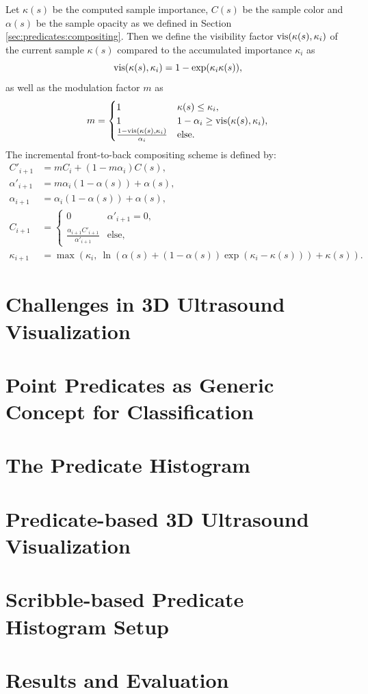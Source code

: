 Let $\kappa(s)$ be the computed sample importance, $C(s)$ be the sample color and $\alpha(s)$ be the sample opacity as we defined in Section \ref{sec:predicates:compositing}. 
Then we define the visibility factor $\text{vis}(\kappa(s), \kappa_i)$ of the current sample $\kappa(s)$ compared to the accumulated importance $\kappa_i$ as
\begin{equation}
	\text{vis}(\kappa(s), \kappa_i)		=		1 - \exp (\kappa_i \kappa(s)),
\end{equation}
as well as the modulation factor $m$ as
\begin{equation}
	m  = 
	\begin{cases}
		1							&		\kappa(s) \leq \kappa_i, \\
		1							&		1-\alpha_i \geq \text{vis}(\kappa(s), \kappa_i), \\
		\frac{1-\text{vis}(\kappa(s), \kappa_i)}{\alpha_i}		& 	\text{else}.
	\end{cases}
\end{equation}
The incremental front-to-back compositing scheme is defined by:
\begin{equation}
	\begin{aligned}
		C'_{i+1}				&=		m C_i + (1 - m \alpha_i) C(s), \\
		\alpha'_{i+1}			&=		m\alpha_i (1 - \alpha(s)) + \alpha(s), \\
		\alpha_{i+1}			&=		\alpha_i (1 - \alpha(s)) + \alpha(s), \\
		C_{i+1}					&=		
		\begin{cases}
			0                                           & \alpha'_{i+1} = 0, \\
			\frac{\alpha_{i+1} C'_{i+1}}{\alpha'_{i+1}} & \text{else},
		\end{cases}\\
		\kappa_{i+1}			&=		\max(\kappa_i, \ \ln(\alpha(s) + (1 - \alpha(s)) \exp(\kappa_i - \kappa(s))) + \kappa(s)).
	\end{aligned}
\end{equation}

\cleardoublepage

\section{Challenges in 3D Ultrasound Visualization}

\section{Point Predicates as Generic Concept for Classification}

\section{The Predicate Histogram}

\section{Predicate-based 3D Ultrasound Visualization}

\section{Scribble-based Predicate Histogram Setup}

\section{Results and Evaluation}
